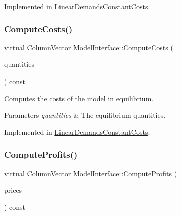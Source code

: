Implemented in \hyperlink{classLinearDemandsConstantCosts_a9d3fa6a3b151c2f1703f23bbee6954cb}{Linear\+Demands\+Constant\+Costs}.

\mbox{\label{classModelInterface_ac0a7cc3db9fc177dc75f16abf00275a7}} 
\subsubsection{\texorpdfstring{Compute\+Costs()}{ComputeCosts()}}
{\footnotesize\ttfamily virtual \hyperlink{classColumnVector}{Column\+Vector} Model\+Interface\+::\+Compute\+Costs (\begin{DoxyParamCaption}\item[{\hyperlink{classColumnVector}{Column\+Vector} const \&}]{quantities }\end{DoxyParamCaption}) const\hspace{0.3cm}{\ttfamily [pure virtual]}}

Computes the costs of the model in equilibrium.


\begin{DoxyParams}{Parameters}
{\em quantities} & The equilibrium quantities. \\
\hline
\end{DoxyParams}


Implemented in \hyperlink{classLinearDemandsConstantCosts_a55e0f15cfc00d8c21fbfd95843c06c44}{Linear\+Demands\+Constant\+Costs}.

\mbox{\label{classModelInterface_a311a000060cece8fc1058cd27bf07864}} 
\subsubsection{\texorpdfstring{Compute\+Profits()}{ComputeProfits()}}
{\footnotesize\ttfamily virtual \hyperlink{classColumnVector}{Column\+Vector} Model\+Interface\+::\+Compute\+Profits (\begin{DoxyParamCaption}\item[{\hyperlink{classColumnVector}{Column\+Vector} const \&}]{prices }\end{DoxyParamCaption}) const\hspace{0.3cm}{\ttfamily [pure virtual]}}

